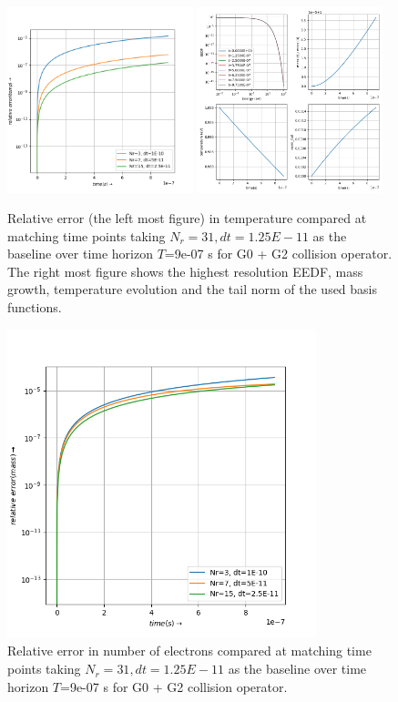 \documentclass{article}
\begin{document}
\begin{figure}[H]
	\centering
	\includegraphics[width=0.48\textwidth]{fig/g02_temp_convergence.png}
	\includegraphics[width=0.48\textwidth]{fig/g02_dt_1.25000000E-11_Nr_31.dat.png}
	\caption{Relative error (the left most figure) in temperature compared at matching time points taking $N_r=31,dt=1.25E-11$ as the baseline over time horizon $T$=9e-07 s for G0 + G2 collision operator. The right most figure shows the highest resolution EEDF, mass growth, temperature evolution and the tail norm of the used basis functions.  }
\end{figure}

\begin{figure}[H]
	\centering
	\includegraphics[width=0.8\textwidth]{fig/g02_mass_convergence.png}
	\caption{Relative error in number of electrons compared at matching time points taking $N_r=31,dt=1.25E-11$ as the baseline over time horizon $T$=9e-07 s for G0 + G2 collision operator. }
\end{figure}
\end{document}
